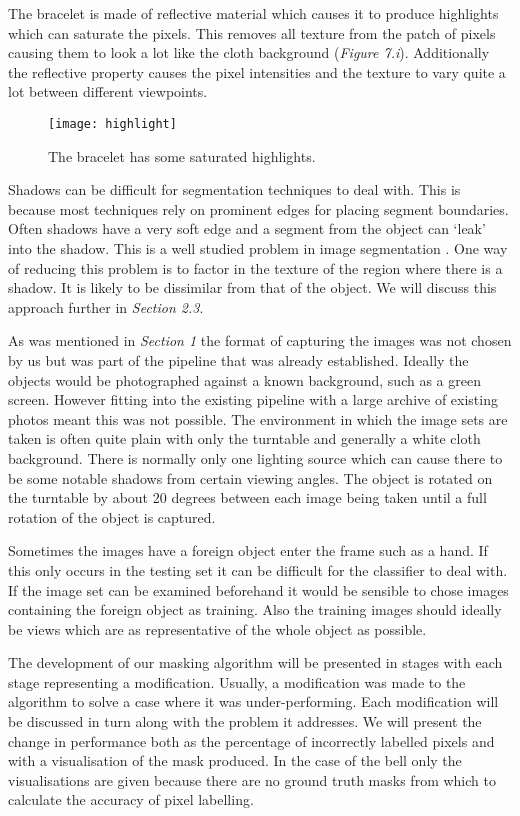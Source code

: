 \documentclass[12pt]{IIBproject}
\begin{document}
The bracelet is made of reflective material which causes it to produce highlights which can saturate the pixels. This removes all texture from the patch of pixels causing them to look a lot like the cloth background (\emph{Figure 7.i}). Additionally the reflective property causes the pixel intensities and the texture to vary quite a lot between different viewpoints.
\begin{figure}[H]
  
  \centering
    \texttt{[image: highlight]}
    \caption{The bracelet has some saturated highlights.}
\end{figure}
Shadows can be difficult for segmentation techniques to deal with. This is because most techniques rely on prominent edges for placing segment boundaries. Often shadows have a very soft edge and a segment from the object can `leak' into the shadow. This is a well studied problem in image segmentation \cite{ecins2014shadow}. One way of reducing this problem is to factor in the texture of the region where there is a shadow. It is likely to be dissimilar from that of the object. We will discuss this approach further in \emph{Section 2.3}. 

As was mentioned in \emph{Section 1} the format of capturing the images was not chosen by us but was part of the pipeline that was already established. Ideally the objects would be photographed against a known background, such as a green screen. However fitting into the existing pipeline with a large archive of existing photos meant this was not possible. 
The environment in which the image sets are taken is often quite plain with only the turntable and generally a white cloth background. There is normally only one lighting source which can cause there to be some notable shadows from certain viewing angles. The object is rotated on the turntable by about 20 degrees between each image being taken until a full rotation of the object is captured. 

Sometimes the images have a foreign object enter the frame such as a hand. If this only occurs in the testing set it can be difficult for the classifier to deal with. If the image set can be examined beforehand it would be sensible to chose images containing the foreign object as training. Also the training images should ideally be views which are as representative of the whole object as possible.

The development of our masking algorithm will be presented in stages with each stage representing a modification. Usually, a modification was made to the algorithm to solve a case where it was under-performing. Each modification will be discussed in turn along with the problem it addresses. We will present the change in performance both as the percentage of incorrectly labelled pixels and with a visualisation of the mask produced. In the case of the bell only the visualisations are given because there are no ground truth masks from which to calculate the accuracy of pixel labelling.
\end{document}

